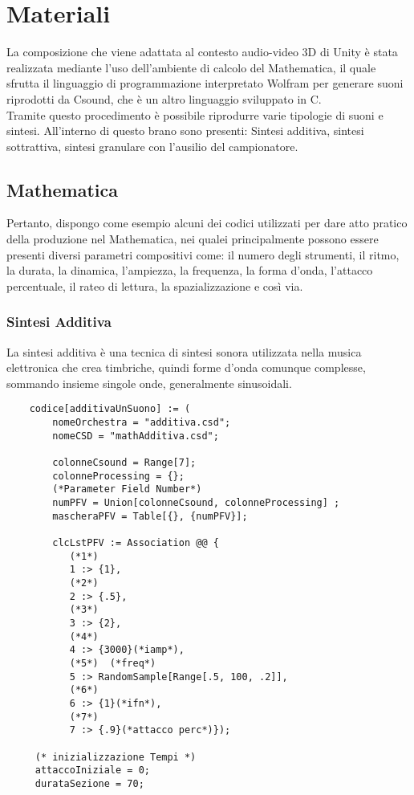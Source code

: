 \section{Materiali}
La composizione che viene adattata al contesto audio-video 3D di Unity è stata realizzata mediante 
l'uso dell'ambiente di calcolo del Mathematica,
il quale sfrutta il linguaggio di programmazione interpretato Wolfram per generare suoni riprodotti da Csound,
che è un altro linguaggio sviluppato in C.\\
Tramite questo procedimento è possibile riprodurre varie tipologie di suoni e sintesi.
All'interno di questo brano sono presenti: Sintesi additiva, sintesi sottrattiva, sintesi granulare con l'ausilio del campionatore.\\

\subsection*{Mathematica}

Pertanto, dispongo come esempio alcuni dei codici utilizzati per dare atto pratico della produzione nel Mathematica, nei qualei principalmente
possono essere presenti diversi parametri compositivi come: il numero degli strumenti, il ritmo, la durata, la dinamica, l'ampiezza, la frequenza, la forma d'onda,
l'attacco percentuale, il rateo di lettura, la spazializzazione e così via.

\subsubsection*{Sintesi Additiva}

La sintesi additiva è una tecnica di sintesi sonora utilizzata nella musica elettronica che crea timbriche,
 quindi forme d'onda comunque complesse, sommando insieme singole onde, generalmente sinusoidali.

\begin{lstlisting}
    codice[additivaUnSuono] := (
        nomeOrchestra = "additiva.csd";
        nomeCSD = "mathAdditiva.csd";
        
        colonneCsound = Range[7];
        colonneProcessing = {};
        (*Parameter Field Number*)
        numPFV = Union[colonneCsound, colonneProcessing] ;
        mascheraPFV = Table[{}, {numPFV}];
        
        clcLstPFV := Association @@ {
           (*1*)
           1 :> {1},
           (*2*)
           2 :> {.5},
           (*3*)
           3 :> {2},
           (*4*)
           4 :> {3000}(*iamp*),
           (*5*)  (*freq*)
           5 :> RandomSample[Range[.5, 100, .2]],
           (*6*)
           6 :> {1}(*ifn*),
           (*7*)
           7 :> {.9}(*attacco perc*)});
     
     (* inizializzazione Tempi *)
     attaccoIniziale = 0;
     durataSezione = 70;
    \end{lstlisting}

